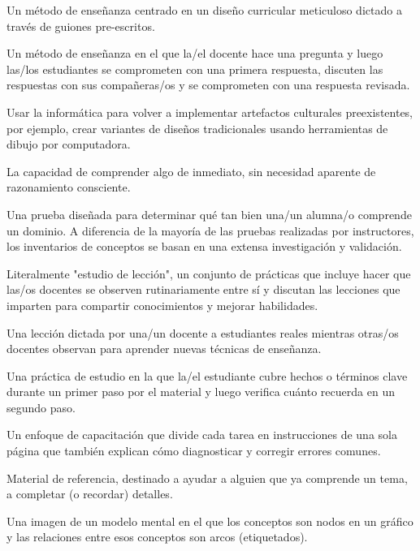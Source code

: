 \begin{description}
 Un método de enseñanza centrado
en un diseño curricular meticuloso dictado a través de guiones pre-escritos.

 Un método de enseñanza en el que la/el docente hace una pregunta y luego las/los estudiantes se comprometen con una primera respuesta, discuten las respuestas con sus compañeras/os y se comprometen con una respuesta revisada.

 Usar la informática
para volver a implementar artefactos culturales preexistentes, por ejemplo,
crear variantes de diseños tradicionales usando herramientas de dibujo por computadora.

 La capacidad de comprender algo de inmediato,
sin necesidad aparente de razonamiento consciente.

 Una prueba diseñada para determinar
qué tan bien una/un alumna/o comprende un dominio. A diferencia de la mayoría de las pruebas realizadas por instructores,
los inventarios de conceptos se basan en una extensa investigación y validación.

 Literalmente "estudio de lección", un conjunto de prácticas que incluye hacer que las/os docentes se observen rutinariamente entre sí y discutan las lecciones que imparten para compartir conocimientos y mejorar habilidades.

 Una lección dictada por una/un docente a estudiantes reales
mientras otras/os docentes observan para aprender nuevas técnicas de enseñanza.

 Una práctica de estudio
en la que la/el estudiante cubre hechos o términos clave durante un primer paso por el material y luego verifica cuánto recuerda en un segundo paso.

 Un enfoque de capacitación que divide
cada tarea en instrucciones de una sola página que también
explican cómo diagnosticar y corregir errores comunes.

 Material de referencia, destinado a ayudar a alguien que ya comprende un tema, a completar (o recordar) detalles.

 Una imagen de un modelo mental en el que
los conceptos son nodos en un gráfico y las relaciones entre esos conceptos son arcos (etiquetados).


\end{description}
